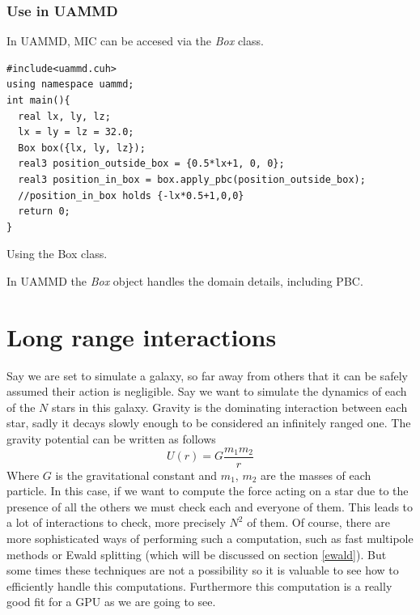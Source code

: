\documentclass[ twoside,openright,titlepage,numbers=noenddot,%
headinclude,footinclude,cleardoublepage=empty,abstract=on,
BCOR=5mm,paper=a4,fontsize=11pt, dvipsnames
]{scrreprt}
\def\ucpp{uammd_cpp_lexer.py:UAMMDCppLexer -x}
\newcommand{\uammd}{\gls{UAMMD}\xspace}
\begin{document}
\subsection{Use in UAMMD}
In \uammd, \gls{MIC} can be accesed via the \emph{Box} class.
\begin{listing}[H]
\begin{verbatim}
#include<uammd.cuh>
using namespace uammd;
int main(){
  real lx, ly, lz;
  lx = ly = lz = 32.0;
  Box box({lx, ly, lz});
  real3 position_outside_box = {0.5*lx+1, 0, 0};
  real3 position_in_box = box.apply_pbc(position_outside_box);
  //position_in_box holds {-lx*0.5+1,0,0}
  return 0; 
}
\end{verbatim}
\caption{Using the Box class.}
\label{code:box}
\end{listing}
In \uammd the \emph{Box} object handles the domain details, including \gls{PBC}.



\chapter{Long range interactions}
Say we are set to simulate a galaxy, so far away from others that it can be safely assumed their action is negligible. Say we want to simulate the dynamics of each of the $N$ stars in this galaxy. Gravity is the dominating interaction between each star, sadly it decays slowly enough to be considered an infinitely ranged one. The gravity potential can be written as follows
\begin{equation}
  \label{eq:gravity}
  U(r) = G\frac{m_1m_2}{r}
\end{equation}
Where $G$ is the gravitational constant and $m_1$, $m_2$ are the masses of each particle.
In this case, if we want to compute the force acting on a star due to the presence of all the others we must check each and everyone of them. This leads to a lot of interactions to check, more precisely $N^2$ of them. Of course, there are more sophisticated ways of performing such a computation, such as fast multipole methods \cite{fmm} or Ewald splitting (which will be discussed on section \ref{ewald}). But some times these techniques are not a possibility so it is valuable to see how to efficiently handle this computations.
Furthermore this computation is a really good fit for a \gls{GPU} as we are going to see.
\end{document}
